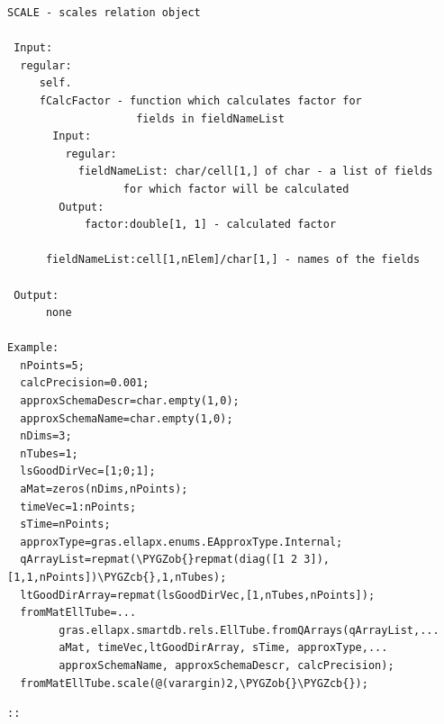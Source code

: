 \documentclass[letterpaper,10pt,english]{sphinxmanual}
\def\PYGZob{\char`\{}
\def\PYGZcb{\char`\}}
\begin{document}
\begin{Verbatim}[commandchars=\\\{\}]
SCALE - scales relation object

 Input:
  regular:
     self.
     fCalcFactor - function which calculates factor for
                    fields in fieldNameList
       Input:
         regular:
           fieldNameList: char/cell[1,] of char - a list of fields
                  for which factor will be calculated
        Output:
            factor:double[1, 1] - calculated factor

      fieldNameList:cell[1,nElem]/char[1,] - names of the fields

 Output:
      none

Example:
  nPoints=5;
  calcPrecision=0.001;
  approxSchemaDescr=char.empty(1,0);
  approxSchemaName=char.empty(1,0);
  nDims=3;
  nTubes=1;
  lsGoodDirVec=[1;0;1];
  aMat=zeros(nDims,nPoints);
  timeVec=1:nPoints;
  sTime=nPoints;
  approxType=gras.ellapx.enums.EApproxType.Internal;
  qArrayList=repmat(\PYGZob{}repmat(diag([1 2 3]),[1,1,nPoints])\PYGZcb{},1,nTubes);
  ltGoodDirArray=repmat(lsGoodDirVec,[1,nTubes,nPoints]);
  fromMatEllTube=...
        gras.ellapx.smartdb.rels.EllTube.fromQArrays(qArrayList,...
        aMat, timeVec,ltGoodDirArray, sTime, approxType,...
        approxSchemaName, approxSchemaDescr, calcPrecision);
  fromMatEllTube.scale(@(varargin)2,\PYGZob{}\PYGZcb{});
\end{Verbatim}

\begin{Verbatim}[commandchars=\\\{\}]
::
\end{Verbatim}
\end{document}
